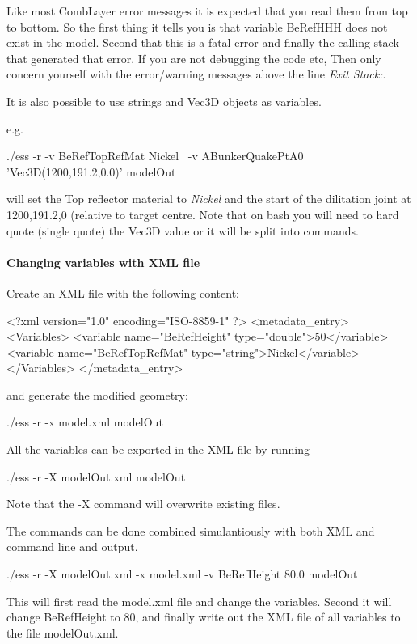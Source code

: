 Like most CombLayer error messages it is expected that you read them from top to bottom. So the first thing it tells you is
that variable BeRefHHH does not exist in the model. Second that this is a fatal error and finally the calling stack that generated
that error. If you are not debugging the code etc, Then only concern yourself with the error/warning messages above the line {\it Exit Stack:}.


It is also possible to use strings and Vec3D objects as variables.

e.g.

\begin{bash}
  ./ess -r -v BeRefTopRefMat Nickel \
           -v ABunkerQuakePtA0 'Vec3D(1200,191.2,0.0)' modelOut
\end{bash}

will set the Top reflector material to {\it Nickel} and the start of the dilitation joint at 1200,191.2,0 (relative to
target centre. Note that on bash you will need to hard quote (single quote) the Vec3D value or it will
be split into commands.


\paragraph[XML file]{Changing variables with XML file}
Create an XML file with the following content:

\begin{xml}
<?xml version="1.0" encoding="ISO-8859-1" ?>
<metadata_entry>
  <Variables>
  <variable name="BeRefHeight" type="double">50</variable>
  <variable name="BeRefTopRefMat" type="string">Nickel</variable>
  </Variables>
</metadata_entry>
\end{xml}

and generate the modified geometry:
\begin{bash}
  ./ess -r -x model.xml modelOut
\end{bash}

All the variables can be exported in the XML file by running
\begin{bash}
  ./ess -r -X modelOut.xml modelOut
\end{bash}
Note that the -X command will overwrite existing files.

The commands can be done combined simulantiously with both XML and command line and output.
\begin{bash}
  ./ess -r -X modelOut.xml -x model.xml -v BeRefHeight 80.0 modelOut 
\end{bash}

This will first read the model.xml file and change the variables. Second it will
change BeRefHeight to 80, and finally write out the XML file of all variables to the file
modelOut.xml.

